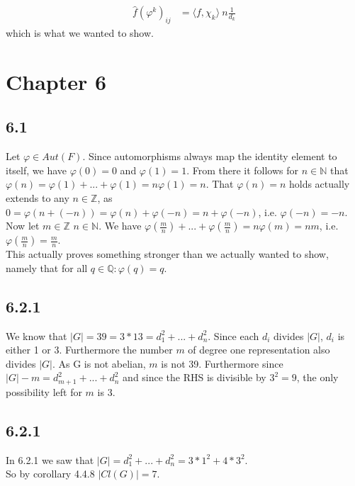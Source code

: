 \documentclass[12pt]{article}
\begin{document}
\begin{align*}
    \widehat{f}(\varphi^{k})_{ij} &= \langle f, \chi_k \rangle \ n \frac{1}{d_k}
\end{align*}
which is what we wanted to show.

\pagebreak

\section*{Chapter 6}

\subsection*{6.1}

Let $\varphi \in Aut(F)$. Since automorphisms always map the identity element to itself, we have $\varphi (0) = 0$ and $\varphi (1) = 1$.
From there it follows for $n \in \mathbb{N}$ that $\varphi(n) = \varphi(1) + ... + \varphi(1) = n \varphi(1) = n$. That $\varphi(n) = n$ holds actually extends to any $n \in \mathbb{Z}$, as $0 = \varphi(n + (-n)) = \varphi(n) + \varphi(-n) = n + \varphi(-n)$, i.e. $\varphi(-n) = -n$.\\
Now let $m \in \mathbb{Z}$ $n \in \mathbb{N}$. We have $\varphi(\frac{m}{n}) + ... + \varphi(\frac{m}{n}) = n \varphi(m) = nm$, i.e. $\varphi(\frac{m}{n}) = \frac{m}{n}$.\\
This actually proves something stronger than we actually wanted to show, namely that for all $q \in \mathbb{Q}: \varphi(q) = q$.

\subsection*{6.2.1}

We know that $|G| = 39 = 3*13 = d_1^2 + ... + d_n^2$. Since each $d_i$ divides $|G|$, $d_i$ is either 1 or 3. Furthermore the number $m$ of degree one representation also divides $|G|$. As G is not abelian, $m$ is not 39. Furthermore since $|G| - m = d_{m+1}^2 + ... + d_n^2$ and since the RHS is divisible by $3^2 = 9$, the only possibility left for $m$ is 3.

\subsection*{6.2.1}

In 6.2.1 we saw that $|G| = d_1^2 + ... + d_n^2 = 3*1^2 + 4*3^2$.\\
So by corollary 4.4.8 $|Cl(G)| = 7$.
\end{document}
